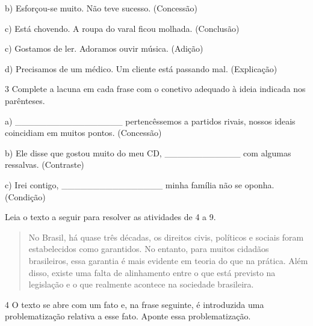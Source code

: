 
b) Esforçou-se muito. Não teve sucesso. (Concessão)


c) Está chovendo. A roupa do varal ficou molhada. (Conclusão)


c) Gostamos de ler. Adoramos ouvir música. (Adição)


d) Precisamos de um médico. Um cliente está passando mal. (Explicação)


\num{3} Complete a lacuna em cada frase com o conetivo adequado à ideia
indicada nos parênteses.

a) \_\_\_\_\_\_\_\_\_\_\_\_\_\_\_\_\_ pertencêssemos a
partidos rivais, nossos ideais coincidiam em muitos pontos. (Concessão)

b) Ele disse que gostou muito do meu CD,
\_\_\_\_\_\_\_\_\_\_\_\_ com algumas ressalvas. (Contraste)

c) Irei contigo, \_\_\_\_\_\_\_\_\_\_\_\_\_\_\_\_ minha
família não se oponha. (Condição)

Leia o texto a seguir para resolver as atividades de 4 a 9.

\begin{quote}
No Brasil, há quase três décadas, os direitos civis, políticos e sociais
foram estabelecidos como garantidos. No entanto, para muitos cidadãos
brasileiros, essa garantia é mais evidente em teoria do que na prática.
Além disso, existe uma falta de alinhamento entre o que está previsto na
legislação e o que realmente acontece na sociedade brasileira.
\end{quote}


\num{4} O texto se abre com um fato e, na frase seguinte, é introduzida
uma problematização relativa a esse fato. Aponte essa problematização.


